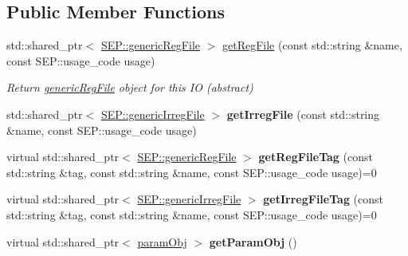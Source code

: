\subsection*{Public Member Functions}
\begin{DoxyCompactItemize}
\item 
std\+::shared\+\_\+ptr$<$ \hyperlink{class_s_e_p_1_1generic_reg_file}{S\+E\+P\+::generic\+Reg\+File} $>$ \hyperlink{class_s_e_p_1_1generic_i_o_a0c6d0460f20f8a35603757925a529f4c}{get\+Reg\+File} (const std\+::string \&name, const S\+E\+P\+::usage\+\_\+code usage)
\begin{DoxyCompactList}\small\item\em Return \hyperlink{class_s_e_p_1_1generic_reg_file}{generic\+Reg\+File} object for this IO (abstract) \end{DoxyCompactList}\item 
\mbox{\label{class_s_e_p_1_1generic_i_o_a528dab9dec46bb7e53a602beea0bd5b6}} 
std\+::shared\+\_\+ptr$<$ \hyperlink{class_s_e_p_1_1generic_irreg_file}{S\+E\+P\+::generic\+Irreg\+File} $>$ {\bfseries get\+Irreg\+File} (const std\+::string \&name, const S\+E\+P\+::usage\+\_\+code usage)
\item 
\mbox{\label{class_s_e_p_1_1generic_i_o_a5a2e7f70614005735dc393ecb2fa3e8a}} 
virtual std\+::shared\+\_\+ptr$<$ \hyperlink{class_s_e_p_1_1generic_reg_file}{S\+E\+P\+::generic\+Reg\+File} $>$ {\bfseries get\+Reg\+File\+Tag} (const std\+::string \&tag, const std\+::string \&name, const S\+E\+P\+::usage\+\_\+code usage)=0
\item 
\mbox{\label{class_s_e_p_1_1generic_i_o_addead4b6a2a089aafb35aebb89d1c588}} 
virtual std\+::shared\+\_\+ptr$<$ \hyperlink{class_s_e_p_1_1generic_irreg_file}{S\+E\+P\+::generic\+Irreg\+File} $>$ {\bfseries get\+Irreg\+File\+Tag} (const std\+::string \&tag, const std\+::string \&name, const S\+E\+P\+::usage\+\_\+code usage)=0
\item 
\mbox{\label{class_s_e_p_1_1generic_i_o_af7f47330540199c237f2fe47edced0bd}} 
virtual std\+::shared\+\_\+ptr$<$ \hyperlink{class_s_e_p_1_1param_obj}{param\+Obj} $>$ {\bfseries get\+Param\+Obj} ()
\item 
\mbox{\label{class_s_e_p_1_1generic_i_o_a8fa37e0c48d085b7c2fbcc4e3b42a11a}} 

\end{DoxyCompactItemize}
